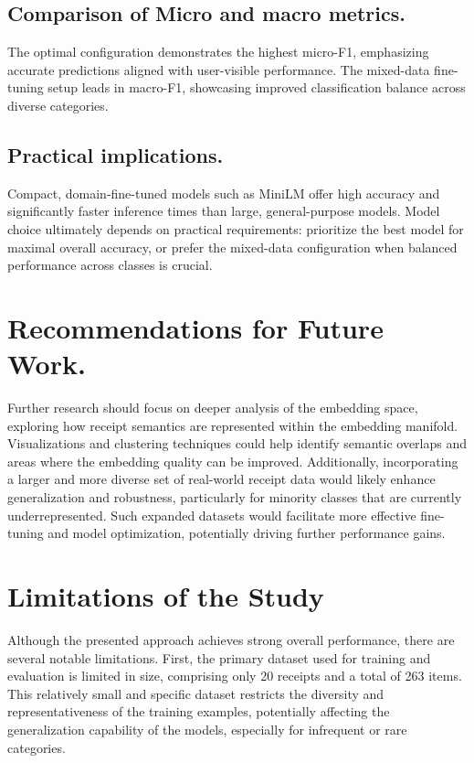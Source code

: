 \documentclass{SGGW-thesis-EN}
\begin{document}
\subsection{Comparison of Micro and macro metrics.} The optimal configuration demonstrates the 
highest micro-F1, emphasizing accurate predictions aligned with user-visible 
performance. The mixed-data fine-tuning setup leads in macro-F1, showcasing improved 
classification balance across diverse categories.

\subsection{Practical implications.} Compact, domain-fine-tuned models such as MiniLM 
offer high accuracy and significantly faster inference times than large, general-purpose 
models. Model choice ultimately depends on practical requirements: prioritize the best 
model for maximal overall accuracy, or prefer the mixed-data configuration when 
balanced performance across classes is crucial.


\section{Recommendations for Future Work.}
Further research should focus on deeper analysis of the embedding space, exploring how
receipt semantics are represented within the embedding manifold. Visualizations and clustering
techniques could help identify semantic overlaps and areas where the embedding quality can
be improved. Additionally, incorporating a larger and more diverse set of real-world receipt
data would likely enhance generalization and robustness, particularly for minority classes
that are currently underrepresented. Such expanded datasets would facilitate more
effective fine-tuning and model optimization, potentially driving further performance gains.

\section{Limitations of the Study}

Although the presented approach achieves strong overall performance, there are several notable limitations.  
First, the primary dataset used for training and evaluation is limited in size, comprising only 20 receipts and a total of 263 items.  
This relatively small and specific dataset restricts the diversity and representativeness of the training examples, potentially affecting the generalization capability of the models, especially for infrequent or rare categories.
\end{document}
